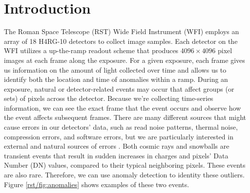 \section{Introduction}
The Roman Space Telescope (RST) Wide Field Instrument (WFI) employs an array of 18 H4RG-10 detectors to collect image samples.
Each detector on the WFI utilizes a up-the-ramp readout scheme that produces $4096 \times 4096$ pixel images at each frame along the exposure. 
For a given exposure, each frame gives us information on the amount of light collected over time and allows us to identify both the location and time of anomalies within a ramp.
During an exposure, natural or detector-related events may occur that affect groups (or sets) of pixels across the detector. 
Because we're collecting time-series information, we can see the exact frame that the event occurs and observe how the event affects subsequent frames. 
There are many different sources that might cause errors in our detectors' data, such as read noise patterns, thermal noise, compression errors, and software errors, but we are particularly interested in external and natural sources of errors \parencite{cillis2018snowballs}. 
Both cosmic rays and snowballs are transient events that result in sudden increases in charges and pixels’ Data Number (DN) values, compared to their typical neighboring pixels.
These events are also rare.
Therefore, we can use anomaly detection to identity these outliers.
Figure \ref{rst/fig:anomalies} shows examples of these two events.

